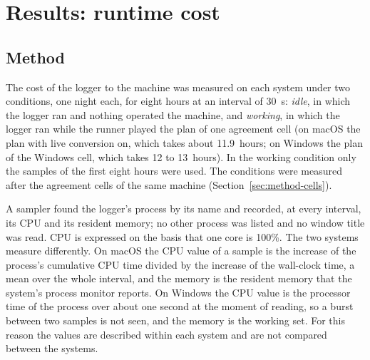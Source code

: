 
\section{Results: runtime cost}
\label{sec:cost}

\subsection{Method}
\label{sec:cost-method}

The cost of the logger to the machine was measured on each system under two conditions, one night each, for eight
hours at an interval of 30~s: \emph{idle}, in which the logger ran and nothing operated the machine, and
\emph{working}, in which the logger ran while the runner played the plan of one agreement cell (on macOS the plan with
live conversion on, which takes about 11.9~hours; on Windows the plan of the Windows cell, which takes 12 to
13~hours). In the working condition only the samples of the first eight hours were used. The conditions were measured
after the agreement cells of the same machine (Section~\ref{sec:method-cells}).

A sampler found the logger's process by its name and recorded, at every interval, its CPU and its resident memory; no
other process was listed and no window title was read. CPU is expressed on the basis that one core is 100\%. The two
systems measure differently. On macOS the CPU value of a sample is the increase of the process's cumulative CPU time
divided by the increase of the wall-clock time, a mean over the whole interval, and the memory is the resident memory
that the system's process monitor reports. On Windows the CPU value is the processor time of the process over about
one second at the moment of reading, so a burst between two samples is not seen, and the memory is the working set.
For this reason the values are described within each system and are not compared between the systems.


